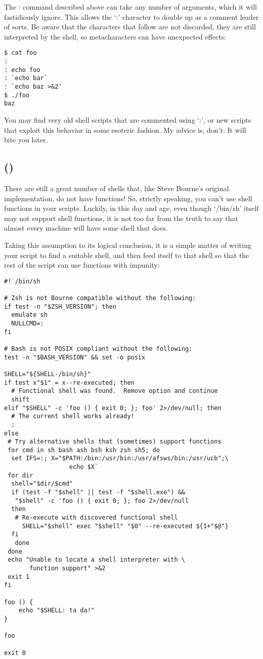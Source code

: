 The : command described above can take any number of arguments, which it will fastidiously ignore. This allows the `:' character to double up as a comment leader of sorts. Be aware that the characters that follow are not discarded, they are still interpreted by the shell, so metacharacters can have unexpected effects:


\begin{Verbatim}[frame=single]
$ cat foo
:
: echo foo
: `echo bar`
: `echo baz >&2'
$ ./foo
baz
\end{Verbatim}

You may find very old shell scripts that are commented using `:', or new scripts that exploit this behavior in some esoteric fashion. My advice is, don't: It will bite you later.

\subsection{()}

There are still a great number of shells that, like Steve Bourne's original implementation, do not have functions! So, strictly speaking, you can't use shell functions in your scripts. Luckily, in this day and age, even though `/bin/sh' itself may not support shell functions, it is not too far from the truth to say that almost every machine will have some shell that does.

Taking this assumption to its logical conclusion, it is a simple matter of writing your script to find a suitable shell, and then feed itself to that shell so that the rest of the script can use functions with impunity: 

\begin{Verbatim}[frame=single]
#! /bin/sh

# Zsh is not Bourne compatible without the following:
if test -n "$ZSH_VERSION"; then
  emulate sh
  NULLCMD=:
fi

# Bash is not POSIX compliant without the following:
test -n "$BASH_VERSION" && set -o posix

SHELL="${SHELL-/bin/sh}"
if test x"$1" = x--re-executed; then
  # Functional shell was found.  Remove option and continue
  shift
elif "$SHELL" -c 'foo () { exit 0; }; foo' 2>/dev/null; then
  # The current shell works already!
  :
else
 # Try alternative shells that (sometimes) support functions
 for cmd in sh bash ash bsh ksh zsh sh5; do
  set IFS=:; X="$PATH:/bin:/usr/bin:/usr/afsws/bin:/usr/ucb";\
                  echo $X`
 for dir
  shell="$dir/$cmd"
  if (test -f "$shell" || test -f "$shell.exe") &&
   "$shell" -c 'foo () { exit 0; }; foo 2>/dev/null
  then
   # Re-execute with discovered functional shell
     SHELL="$shell" exec "$shell" "$0" --re-executed ${1+"$@"}
  fi
   done
 done
 echo "Unable to locate a shell interpreter with \
       function support" >&2
 exit 1
fi

foo () {
    echo "$SHELL: ta da!"
}

foo

exit 0
\end{Verbatim}

